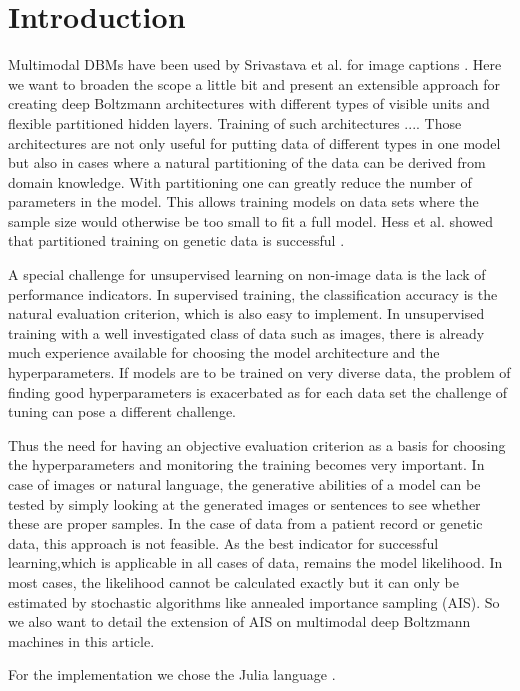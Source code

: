\documentclass[12pt]{article}
\begin{document}
\section{Introduction}
Multimodal DBMs have been used by Srivastava et al. for image captions \citep{srivastava2012multimodal}.
Here we want to broaden the scope a little bit and present an extensible approach for creating deep Boltzmann architectures with different types of visible units and flexible partitioned hidden layers. Training of such architectures ....
Those architectures are not only useful for putting data of different types in one model but also in cases where a natural partitioning of the data can be derived from domain knowledge. With partitioning one can greatly reduce the number of parameters in the model. This allows training models on data sets where the sample size would otherwise be too small to fit a full model.
Hess et al. showed that partitioned training on genetic data is successful \citep{hess2017partitioned}.

A special challenge for unsupervised learning on non-image data is the lack of performance indicators.
In supervised training, the classification accuracy is the natural evaluation criterion, which is also easy to implement.
In unsupervised training with a well investigated class of data such as images, there is already much experience available for choosing the model architecture and the hyperparameters. If models are to be trained on very diverse data, the problem of finding good hyperparameters is exacerbated as for each data set the challenge of tuning can pose a different challenge.

Thus the need for having an objective evaluation criterion as a basis for choosing the hyperparameters and monitoring the training becomes very important.
In case of images or natural language, the generative abilities of a model can be tested by simply looking at the generated images or sentences to see whether these are proper samples. In the case of data from a patient record or genetic data, this approach is not feasible. As the best indicator for successful learning,which is applicable in all cases of data, remains the model likelihood. In most cases, the likelihood cannot be calculated exactly but it can only be estimated by stochastic algorithms like annealed importance sampling (AIS). So we also want to detail the extension of AIS on multimodal deep Boltzmann machines in this article.

For the implementation we chose the Julia language \citep{bezanson2017julia}. %
\end{document}
